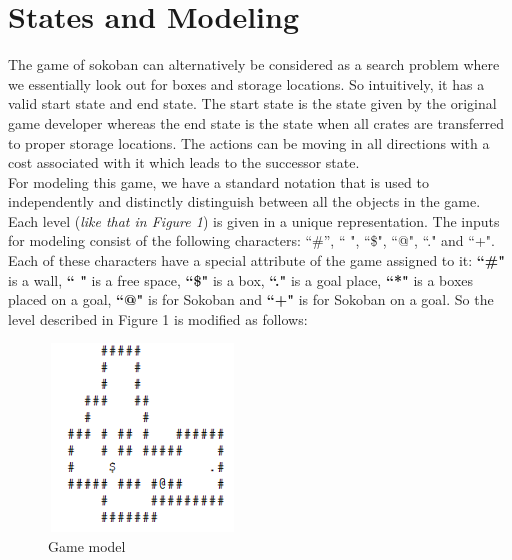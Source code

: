 \documentclass[10pt, final]{article}
\newcommand{\br}[1][.75]{\ \\[#1\baselineskip]}
\begin{document}
\section{States and Modeling}
The game of sokoban can alternatively be considered as a search problem where we essentially look out for boxes and storage locations. So intuitively, it has a valid start state and end state. The start state is the state given by the original game developer whereas the end state is the state when all crates are transferred to proper storage locations. The actions can be moving in all directions with a cost associated with it which leads to the successor state. \br
For modeling this game, we have a standard notation that is used to independently and distinctly distinguish between all the objects in the game. Each level (\textit{like that in Figure 1}) is given in a unique representation. The inputs for modeling consist of the following characters: ``\#'', `` ", ``\$", ``@", ``." and ``+". Each of these characters have a special attribute of the game assigned to it: \textbf{``\#"} is a wall,  \textbf{`` "} is a free space, \textbf{``\$"} is a box, \textbf{``."} is a goal place,  \textbf{``*"} is a boxes placed on a goal, \textbf{``@"} is for Sokoban and \textbf{``+"} is for Sokoban on a goal. So the level described in Figure 1 is modified as follows:  \\
	\begin{figure}[h!]
	\centering
	\includegraphics[width=5cm, height=5cm]{pic4.png}
	\caption{Game model}
\end{figure}
\end{document}
